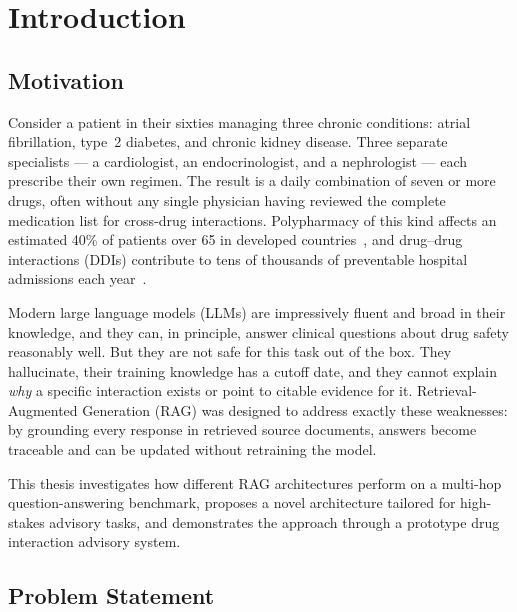 \chapter{Introduction}
\label{cha:introduction}

\section{Motivation}
\label{sec:motivation}

Consider a patient in their sixties managing three chronic conditions: atrial fibrillation,
type~2 diabetes, and chronic kidney disease.
Three separate specialists --- a cardiologist, an endocrinologist, and a nephrologist ---
each prescribe their own regimen.
The result is a daily combination of seven or more drugs, often without any single
physician having reviewed the complete medication list for cross-drug interactions.
Polypharmacy of this kind affects an estimated 40\% of patients over 65 in developed
countries~\cite{masnoon2017polypharmacy}, and drug--drug interactions (DDIs) contribute
to tens of thousands of preventable hospital admissions each year~\cite{lazarou1998ade}.

Modern large language models (LLMs) are impressively fluent and broad in their knowledge,
and they can, in principle, answer clinical questions about drug safety reasonably well.
But they are not safe for this task out of the box.
They hallucinate, their training knowledge has a cutoff date, and they cannot
explain \emph{why} a specific interaction exists or point to citable evidence for it.
Retrieval-Augmented Generation (RAG) was designed to address exactly these weaknesses:
by grounding every response in retrieved source documents, answers become traceable
and can be updated without retraining the model.

This thesis investigates how different RAG architectures perform on a multi-hop
question-answering benchmark, proposes a novel architecture tailored for high-stakes
advisory tasks, and demonstrates the approach through a prototype drug interaction
advisory system.

\section{Problem Statement}
\label{sec:problem}

